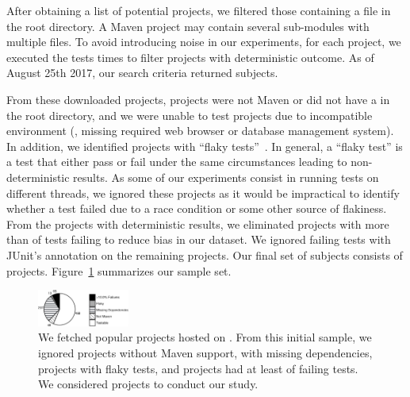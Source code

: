 After obtaining a list of potential projects, we filtered those
containing a \pomf{} file in the root directory.  A Maven project may
contain several sub-modules with multiple \pomf{} files.
To avoid introducing noise in our experiments, for each project, we
executed the tests \SubjectsReruns{} times to filter projects with
deterministic outcome.
As of August 25th 2017, our search criteria returned \SubjectsGithub{}
subjects.

From these \SubjectsGithub{} downloaded projects,
\SubjectsGithubNotMaven{} projects were not Maven or did not have a
\pomf{} in the root directory, and we were unable to test
\SubjectsGithubNotTestable{} projects  due to incompatible environment
(\eg, missing required web browser or database management system).
In addition, we identified \SubjectsGithubFlaky{} projects with
``flaky tests''~\cite{luo-etal-fse2014}.
In general, a ``flaky test'' is a test that either pass or fail under
the same circumstances leading to non-deterministic results.
As some of our experiments consist in running tests on different
threads, we ignored these projects as it would be impractical
to identify whether a test failed due to a race condition or some
other source of flakiness.
From the \SubjectsGithubConsistant{} projects with
deterministic results, we eliminated \SubjectsGithubTooManyFailures{}
projects with more than \SuiteFailingThreshold{} of tests failing to
reduce bias in our dataset.
We ignored failing tests with JUnit's
 annotation on the remaining projects.
Our final set of subjects consists of \numSubjs{} projects.
Figure~\ref{fig:subjects} summarizes our sample set.

\begin{figure}[ht]
  \centering
  \includegraphics[width=0.27\textwidth]{results/piechart-subjs.pdf}
  \caption{\label{fig:subjects}We fetched \SubjectsGithub{} popular projects
  hosted on \github{}. From this initial sample, we ignored
  \SubjectsGithubNotMaven{} projects without Maven support,
  \SubjectsGithubNotTestable{} with missing dependencies,
  \SubjectsGithubFlaky{} projects with flaky tests, and
  \SubjectsGithubTooManyFailures{} projects had at least
  \SuiteFailingThreshold{} of failing tests. We considered
  \numSubjs{} projects to conduct our study.}
  \vspace{-2ex}
\end{figure}

